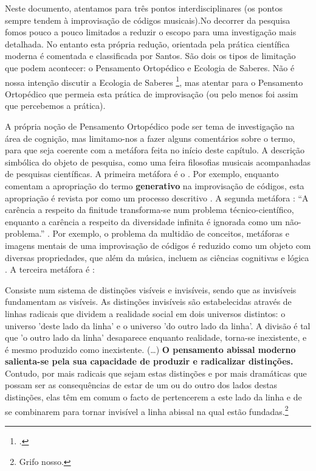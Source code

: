 Neste documento, atentamos para três pontos interdisciplinares (os pontos sempre tendem à improvisação de códigos musicais).No decorrer da pesquisa fomos pouco a pouco limitados a reduzir o escopo para uma investigação mais detalhada. No entanto esta própria redução, orientada pela prática científica moderna é comentada e classificada por Santos. São dois os tipos de limitação que podem acontecer: o Pensamento Ortopédico e Ecologia de Saberes. Não é nossa intenção discutir a Ecologia de Saberes \footnote{.}, mas atentar para o Pensamento Ortopédico que permeia esta prática de improvisação (ou pelo menos foi assim que percebemos a prática).

A própria noção de Pensamento Ortopédico pode ser tema de investigação na área de cognição, mas limitamo-nos a fazer alguns comentários sobre o termo, para que seja coerente com a metáfora feita no início deste capítulo. A descrição simbólica do objeto de pesquisa, como uma feira filosofias musicais acompanhadas de pesquisas científicas. A primeira metáfora é o . Por exemplo, enquanto  comentam a apropriação do termo \textbf{generativo} na improvisação de códigos, esta apropriação é revista por  como um processo descritivo . A segunda metáfora : ``A carência a respeito da finitude transforma-se num problema técnico-científico, enquanto a carência a respeito da diversidade infinita é ignorada como um não-problema.'' \cite[p.~15]{santos_filosofia_2008}. Por exemplo, o problema da multidão de conceitos, metáforas e imagens mentais de uma improvisação de códigos é reduzido como um objeto com diversas propriedades, que além da música, incluem as ciências cognitivas \cite{pressing_cognitive_1984,pressing_improvisation_1987} e lógica \cite{mclean_music_2006,Forth2010}. A terceira metáfora é  \cite[p.~1--4]{santos_abissal_2007}:

\begin{citacao}
Consiste num sistema de distinções visíveis e invisíveis, sendo que as invisíveis fundamentam as visíveis. As distinções invisíveis são estabelecidas através de linhas radicais que dividem a realidade social em dois universos distintos: o universo  'deste lado da linha' e o universo 'do outro lado da linha'. A divisão é tal que 'o outro lado da linha' desaparece enquanto realidade, torna-se inexistente, e é mesmo produzido como inexistente. (\ldots) \textbf{O pensamento abissal moderno salienta-se pela sua capacidade de produzir e radicalizar distinções.} Contudo, por mais radicais que sejam estas distinções e por mais dramáticas que possam ser as consequências de estar de um ou do outro dos lados destas distinções, elas têm em comum o facto de pertencerem a este lado da linha e de se combinarem para tornar invisível a linha abissal na qual estão fundadas.\footnote{Grifo nosso.} 
\end{citacao}

